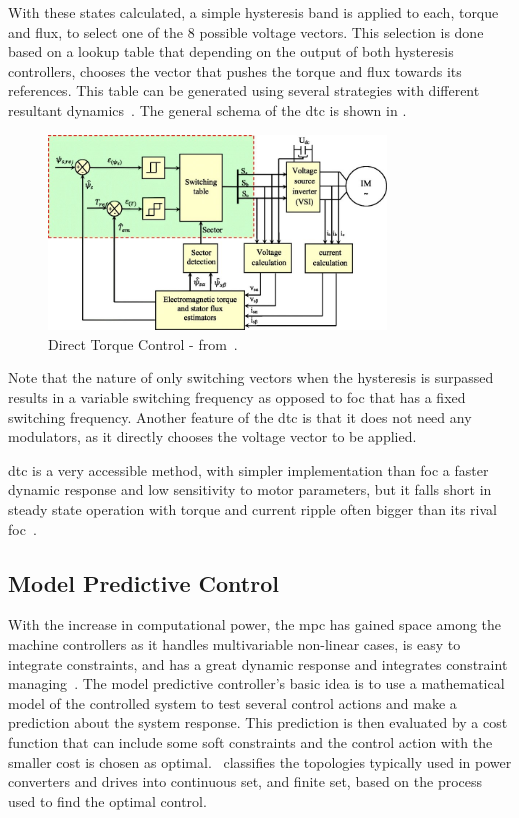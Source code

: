 With these states calculated, a simple hysteresis band is applied to each, torque and flux, to select one of the 8 possible voltage vectors. This selection is done based on a lookup table that depending on the output of both hysteresis controllers, chooses the vector that pushes the torque and flux towards its references. This table can be generated using several strategies with different resultant dynamics~\cite{Buja:DTC_lookup_strategies:1997,Nasr:DTC_PMSM_improvement:2022}. The general schema of the \gls{dtc} is shown in .
\begin{figure}[!htb]
	\centering
	\includegraphics[width=0.8\textwidth]{Figures/dtc_schema.jpg}
	\caption[Direct Torque Control - from~\citet{Quanjli:DTC_schema:2019}.]{Direct Torque Control - from~\citet{Quanjli:DTC_schema:2019}.}
	\label{fig:example_DTC} %
\end{figure}
Note that the nature of only switching vectors when the hysteresis is surpassed results in a variable switching frequency as opposed to \gls{foc} that has a fixed switching frequency. Another feature of the \gls{dtc} is that it does not need any modulators, as it directly chooses the voltage vector to be applied.

 \gls{dtc} is a very accessible method, with simpler implementation than \gls{foc} a faster dynamic response and low sensitivity to motor parameters, but it falls short in steady state operation with torque and current ripple often bigger than its rival \gls{foc}~\cite{Zhong:DTC_pmsm_dynamics:1997,Niu:DTC_vs_other_DTC_vs_FOC:2016}.



\subsection{Model Predictive Control}
With the increase in computational power, the \gls{mpc} has gained space among the machine controllers as it handles multivariable non-linear cases, is easy to integrate constraints, and has a great dynamic response and integrates constraint managing~\cite{Vazquez:MPC_uses:2014}. The model predictive controller's basic idea is to use a mathematical model of the controlled system to test several control actions and make a prediction about the system response. This prediction is then evaluated by a cost function that can include some soft constraints and the control action with the smaller cost is chosen as optimal.~\citet{Vazquez:MPC_in_power_systems_review:2017:IEEE} classifies the topologies typically used in power converters and drives into continuous set, and finite set, based on the process used to find the optimal control. 

